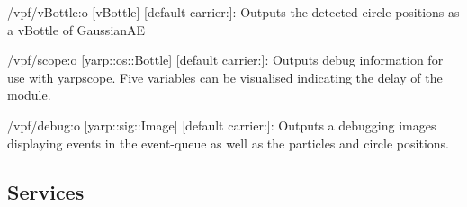 \begin{DoxyItemize}
\item /vpf/v\+Bottle\+:o \mbox{[}v\+Bottle\mbox{]} \mbox{[}default carrier\+:\mbox{]}\+: Outputs the detected circle positions as a v\+Bottle of Gaussian\+AE
\item /vpf/scope\+:o \mbox{[}yarp\+::os\+::\+Bottle\mbox{]} \mbox{[}default carrier\+:\mbox{]}\+: Outputs debug information for use with yarpscope. Five variables can be visualised indicating the delay of the module.
\item /vpf/debug\+:o \mbox{[}yarp\+::sig\+::\+Image\mbox{]} \mbox{[}default carrier\+:\mbox{]}\+: Outputs a debugging images displaying events in the event-\/queue as well as the particles and circle positions.
\end{DoxyItemize}\hypertarget{group__zynqGrabber_services_sec}{}\subsection{Services}\label{group__zynqGrabber_services_sec}
